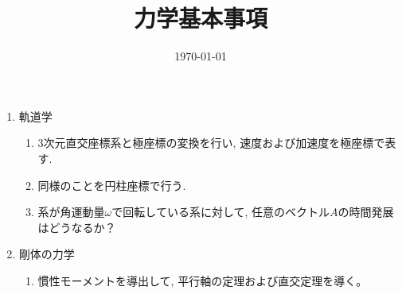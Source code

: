 \documentclass[11pt,a4paper]{jarticle}
\title{力学基本事項}
\author{}
\date{\today}
\begin{document}
\maketitle
\begin{enumerate}
    \item 軌道学
    \begin{enumerate}
        \item 3次元直交座標系と極座標の変換を行い, 速度および加速度を極座標で表す.
        \item 同様のことを円柱座標で行う.
        \item 系が角運動量$ω$で回転している系に対して, 任意のベクトル$A$の時間発展はどうなるか？
    \end{enumerate}
    \item 剛体の力学
    \begin{enumerate}
        \item 慣性モーメントを導出して, 平行軸の定理および直交定理を導く。
    \end{enumerate}
\end{enumerate}
\end{document}
